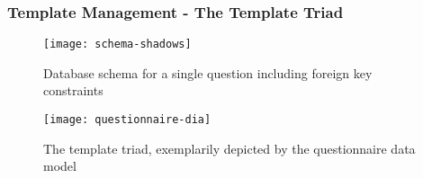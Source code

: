     \subsubsection{Template Management - The Template Triad}
    \label{section:implementation:template-triad}
        \begin{figure}
            \centering
            \texttt{[image: schema-shadows]}
            \caption{Database schema for a single question including foreign key constraints}
            \label{fig:schema-shadows}
        \end{figure}
        \begin{figure}
            \centering
            \texttt{[image: questionnaire-dia]}
            \caption{The template triad, exemplarily depicted by the questionnaire data model}
            \label{fig:questionnaire-dia}
        \end{figure}

